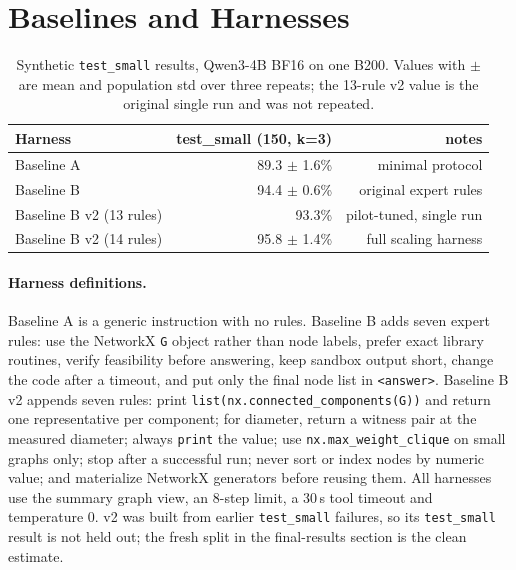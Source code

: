 \documentclass[11pt]{article}
\begin{document}
\section{Baselines and Harnesses}
\begin{table}[h]
\centering
\begin{tabular}{lrr}
\toprule
Harness & test\_small (150, k=3) & notes \\
\midrule
Baseline A & 89.3 $\pm$ 1.6\% & minimal protocol \\
Baseline B & 94.4 $\pm$ 0.6\% & original expert rules \\
Baseline B v2 (13 rules) & 93.3\% & pilot-tuned, single run \\
Baseline B v2 (14 rules) & 95.8 $\pm$ 1.4\% & full scaling harness \\
\bottomrule
\end{tabular}
\caption{Synthetic \texttt{test\_small} results, Qwen3-4B BF16 on one B200.
Values with $\pm$ are mean and population std over three repeats; the 13-rule
v2 value is the original single run and was not repeated.}
\end{table}

\paragraph{Harness definitions.}
Baseline A is a generic instruction with no rules. Baseline B adds seven expert
rules: use the NetworkX \texttt{G} object rather than node labels, prefer exact
library routines, verify feasibility before answering, keep sandbox output
short, change the code after a timeout, and put only the final node list in
\texttt{<answer>}. Baseline B v2 appends seven rules: print
\texttt{list(nx.connected\_components(G))} and return one representative per
component; for diameter, return a witness pair at the measured diameter; always
\texttt{print} the value; use \texttt{nx.max\_weight\_clique} on small graphs
only; stop after a successful run; never sort or index nodes by numeric value;
and materialize NetworkX generators before reusing them. All harnesses use the
summary graph view, an 8-step limit, a 30\,s tool timeout and temperature 0.
v2 was built from earlier \texttt{test\_small} failures, so its
\texttt{test\_small} result is not held out; the fresh split in the
final-results section is the clean estimate.


\end{document}
